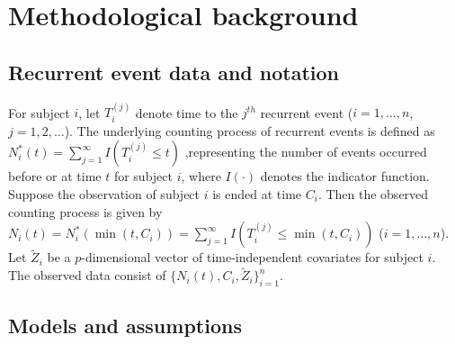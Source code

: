 \hypertarget{methodological-background}{%
\section{Methodological background}\label{methodological-background}}

\hypertarget{recurrent-event-data-and-notation}{%
\subsection{Recurrent event data and notation}\label{recurrent-event-data-and-notation}}

For subject \(i\), let \(T_i^{(j)}\) denote time to the \(j^{th}\)
recurrent event (\(i = 1, \dots , n\), \(j=1,2,\ldots\)). The underlying counting process of recurrent events is defined as
\(N_{i} ^{*}(t) = \sum _{j = 1} ^{\infty} I(T_{i} ^{(j)} \le t)\)
,representing the number of events occurred before or at time \(t\) for subject \(i\), where \(I(\cdot)\) denotes the indicator function.
Suppose the observation of subject \(i\) is ended at time \(C_i\). Then the observed counting process is given by
\(N_{i} (t) = N_{i} ^{*}(\min(t, C_i)) = \sum _{j = 1} ^{\infty} I(T_{i} ^{(j)} \le \min(t, C_i))\) (\(i = 1, \dots , n\)). Let \(\tilde{Z}_i\) be a \(p\)-dimensional
vector of time-independent covariates for subject \(i\). The observed
data consist of \(\{ N_{i}(t), C_i, \tilde{Z}_{i} \}_{i = 1} ^{n}\).

\hypertarget{models-and-assumptions}{%
\subsection{Models and assumptions}\label{models-and-assumptions}}

